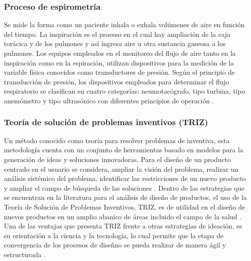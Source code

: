 \documentclass[12pt]{article}
\begin{document}
\subsubsection{Proceso de espirometr\'ia}
Se mide la forma como un paciente inhala o exhala vol\'umenes de aire en funci\'on del tiempo. La inspiraci\'on es el proceso en el cual hay ampliaci\'on de la caja tor\'acica y de los pulmones y as\'i ingresa aire u otra sustancia gaseosa a los pulmones. Los equipos empleados en el monitoreo del flujo de aire tanto en la inspiraci\'on como en la espiraci\'on, utilizan dispositivos para la medici\'on de la variable f\'isica conocidos como transductores de presi\'on. Seg\'un el principio de transducci\'on de presi\'on, los dispositivos empleados para determinar el flujo respiratorio se clasifican en cuatro categor\'ias: neumotac\'ografo, tipo turbina, tipo anem\'ometro y tipo ultras\'onico con diferentes principios de operaci\'on \cite{14}. 



\subsubsection{Teor\'ia de soluci\'on de problemas inventivos (TRIZ)}

Un m\'etodo conocido como teor\'ia para resolver problemas de inventiva, esta metodolog\'ia cuenta con un conjunto de herramientas basado en modelos para la generaci\'on de ideas y soluciones innovadoras. Para el dise\~{n}o de un producto centrado en el usuario se considera, ampliar la visi\'on del problema, realizar un an\'alisis sist\'emico del problema, identificar las restricciones de un nuevo producto y ampliar el campo de b\'usqueda de las soluciones \cite{15}.  Dentro de las estrategias que se encuentran en la literatura para el an\'alisis de dise\~{n}o de productos, el uso de la Teor\'ia de Soluci\'on de Problemas Inventivos, TRIZ, es de utilidad en el dise\~{n}o de nuevos productos en un amplio abanico de \'areas incluido el campo de la salud \cite{16}.  Una de las ventajas que presenta TRIZ frente a otras estrategias de ideaci\'on, es su orientaci\'on a la ciencia y la tecnolog\'ia, lo cual permite que la etapa de convergencia de los procesos de dise\~{n}no se pueda realizar de manera \'agil y estructurada \cite{17}. 
\end{document}
